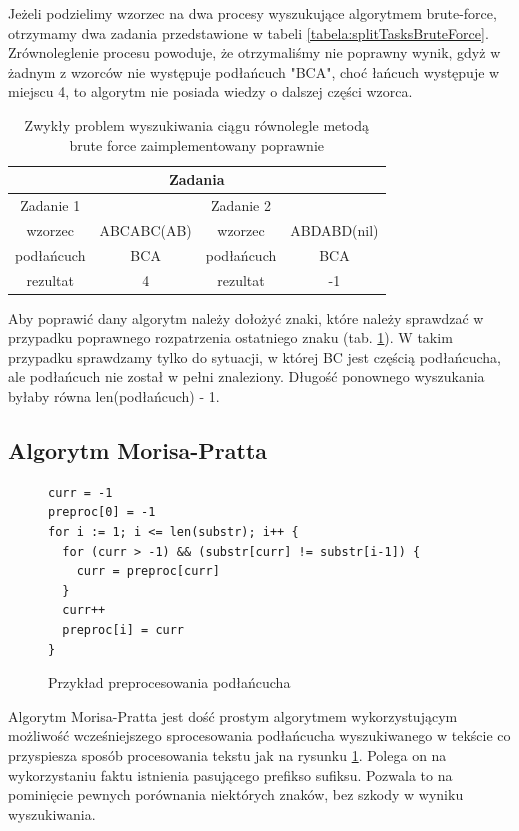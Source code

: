 Jeżeli podzielimy wzorzec na dwa procesy wyszukujące algorytmem brute-force,
otrzymamy dwa zadania przedstawione w tabeli \ref{tabela:splitTasksBruteForce}. Zrównoleglenie procesu 
powoduje, że otrzymaliśmy nie poprawny wynik, gdyż w żadnym z wzorców nie
występuje podłańcuch "BCA", choć łańcuch występuje w miejscu 4, to algorytm nie
posiada wiedzy o dalszej części wzorca.

\begin{table}
  \centering
  \begin{tabular}{ |c|c||c|c|  } 
    \hline
    \multicolumn{4}{|c|}{Zadania} \\
    \hline
    Zadanie 1 & & Zadanie 2 & \\
    \hline
    wzorzec & ABCABC(AB) & wzorzec & ABDABD(nil) \\
    \hline
    podłańcuch & BCA & podłańcuch & BCA \\
    \hline
    rezultat & 4 & rezultat & -1 \\ 
    \hline
  \end{tabular}
  \caption{Zwykły problem wyszukiwania ciągu równolegle metodą brute force 
  zaimplementowany poprawnie}
  \label{tabela:splitBruteForceCorrected}
\end{table}

Aby poprawić dany algorytm należy dołożyć znaki, które należy sprawdzać w 
przypadku poprawnego rozpatrzenia ostatniego znaku (tab.
\ref{tabela:splitBruteForceCorrected}). W takim przypadku sprawdzamy tylko do
sytuacji, w której BC jest częścią podłańcucha, ale podłańcuch nie został w 
pełni znaleziony. Długość ponownego wyszukania byłaby równa len(podłańcuch) - 1.


\subsection{Algorytm Morisa-Pratta}

\begin{figure}[h]
  \centering
  \begin{lstlisting}
curr = -1
preproc[0] = -1
for i := 1; i <= len(substr); i++ {
  for (curr > -1) && (substr[curr] != substr[i-1]) {
    curr = preproc[curr]
  }
  curr++
  preproc[i] = curr
}
  \end{lstlisting}
  \caption{Przykład preprocesowania podłańcucha}
  \label{fig:code:preprocessMorisPratt}
\end{figure}

Algorytm Morisa-Pratta jest dość prostym algorytmem wykorzystującym możliwość
wcześniejszego sprocesowania podłańcucha wyszukiwanego w tekście co przyspiesza
sposób procesowania tekstu jak na rysunku \ref{fig:code:preprocessMorisPratt}.
Polega on na wykorzystaniu faktu istnienia pasującego prefikso sufiksu.
Pozwala to na pominięcie pewnych porównania niektórych znaków, bez szkody w
wyniku wyszukiwania.

